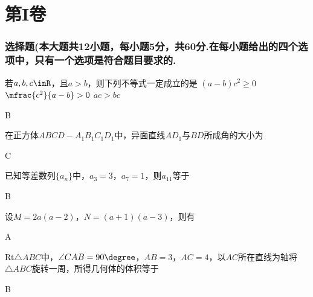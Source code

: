 \part{第I卷}
\vspace{-3em}
\startexercise
\begin{exercise}
\section{选择题(本大题共12小题，每小题5分，共60分.在每小题给出的四个选项中，只有一个选项是符合题目要求的.}
  \item%
    若$a,b,c\inR$，且$a>b$，则下列不等式一定成立的是\xz
       {$(a-b)c^2\geqslant0$}
       {$\mfrac{c^2}{a-b}>0$}
       {$ac>bc$}
    \begin{answer}
      B
    \end{answer}
  \item%
    在正方体$ABCD-A_1B_1C_1D_1$中，异面直线$AD_1$与$BD$所成角的大小为\xz
    \xx{30\degree}{45\degree}{60\degree}{90\degree}
    \begin{answer}
      C
    \end{answer}
  \item%
    已知等差数列$\{a_n\}$中，$a_3=3$，$a_7=1$，则$a_{11}$等于\xz
    \begin{answer}
      B
    \end{answer}
  \item%
    设$M=2a(a-2)$，$N=(a+1)(a-3)$，则有\xz
    \begin{answer}
      A
    \end{answer}
  \item%
    Rt$\triangle{ABC}$中，$\angle{CAB}=90\degree$，$AB=3$，$AC=4$，以$AC$所在直线为轴将$\triangle{ABC}$旋转一周，所得几何体的体积等于\xz
      \xx{$8\piup$}{$12\piup$}{$24\piup$}{$36\piup$}
    \begin{answer}
      B
    \end{answer}
  \item%

\end{exercise}
